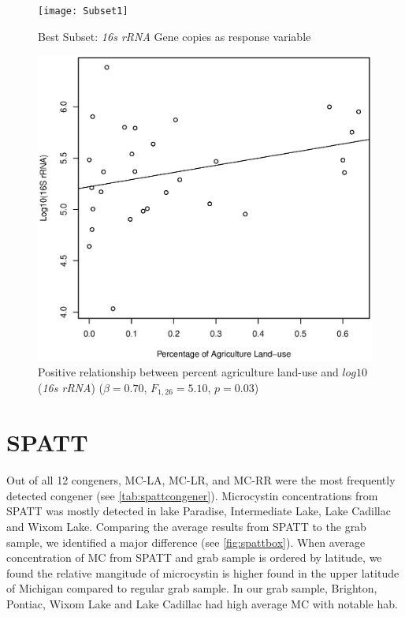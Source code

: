 \begin{figure}[!ht]
  \texttt{[image: Subset1]}
  \caption{Best Subset: \emph{16s rRNA} Gene copies as response variable}
  \label{subset2}
\end{figure}

\begin{figure}[!ht]
  \includegraphics[width=\textwidth]{figures/Agriculture}
  \caption{Positive relationship between percent agriculture land-use and $log10$(\emph{16s rRNA}) ($\beta=0.70$, $F_{{1,26}}=5.10$, $p=0.03$)}
  \label{fig:agriculture}
\end{figure}
\clearpage

\section{SPATT}

Out of all 12 congeners, MC-LA, MC-LR, and MC-RR were the most frequently detected congener (see \ref{tab:spattcongener}). Microcystin concentrations from SPATT was mostly detected in lake Paradise, Intermediate Lake, Lake Cadillac and Wixom Lake. Comparing the average results from SPATT to the grab sample, we identified a major difference (see \ref{fig:spattbox}). When average concentration of MC from SPATT and grab sample is ordered by latitude, we found the relative mangitude of microcystin is higher found in the upper latitude of Michigan compared to regular grab sample. In our grab sample, Brighton, Pontiac, Wixom Lake and Lake Cadillac had high average MC with notable \gls{hab}.

